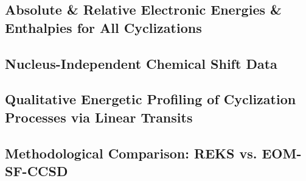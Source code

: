 \documentclass[aip,jcp,preprint,superscriptaddress,floatfix]{revtex4-1}
\begin{document}
\subsection{Absolute \& Relative Electronic Energies \& Enthalpies for All
Cyclizations\label{subsec:energy-tables}}

\subsection{Nucleus-Independent Chemical Shift Data\label{subsec:nics-data}}

\subsection{Qualitative Energetic Profiling of Cyclization Processes via Linear
Transits\label{subsec:lintransit-data}}

\subsection{Methodological Comparison: REKS vs.
EOM-SF-CCSD\label{subsec:reks-data}}



\clearpage
\newpage


\end{document}
